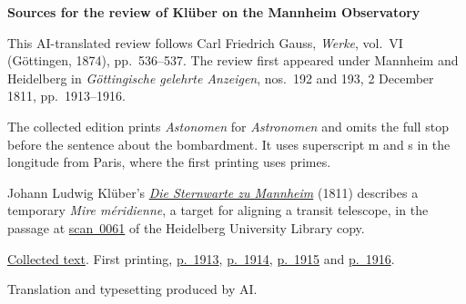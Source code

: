 \clearpage\thispagestyle{empty}
\begin{center}\textbf{Sources for the review of Klüber on the Mannheim Observatory}\end{center}
\noindent This AI-translated review follows Carl Friedrich Gauss, \textit{Werke}, vol.~VI (Göttingen, 1874), pp.~536--537. The review first appeared under Mannheim and Heidelberg in \textit{Göttingische gelehrte Anzeigen}, nos.~192 and 193, 2 December 1811, pp.~1913--1916.
\par\smallskip\noindent The collected edition prints \textit{Astonomen} for \textit{Astronomen} and omits the full stop before the sentence about the bombardment. It uses superscript m and s in the longitude from Paris, where the first printing uses primes.
\par\smallskip\noindent Johann Ludwig Klüber's \href{https://doi.org/10.11588/diglit.19120}{\textit{Die Sternwarte zu Mannheim}} (1811) describes a temporary \textit{Mire méridienne}, a target for aligning a transit telescope, in the passage at \href{https://doi.org/10.11588/diglit.19120#0061}{scan~0061} of the Heidelberg University Library copy.
\par\smallskip\noindent \href{https://gdz.sub.uni-goettingen.de/id/PPN236007467}{Collected text}. First printing, \href{https://images.p.sub.uni-goettingen.de/iiif/image/gdz:PPN319721507_1811:00001947/full/1650,/0/default.jpg}{p.~1913}, \href{https://images.p.sub.uni-goettingen.de/iiif/image/gdz:PPN319721507_1811:00001948/full/1650,/0/default.jpg}{p.~1914}, \href{https://images.p.sub.uni-goettingen.de/iiif/image/gdz:PPN319721507_1811:00001949/full/1650,/0/default.jpg}{p.~1915} and \href{https://images.p.sub.uni-goettingen.de/iiif/image/gdz:PPN319721507_1811:00001950/full/1650,/0/default.jpg}{p.~1916}.
\par\smallskip\noindent Translation and typesetting produced by AI.
\clearpage
